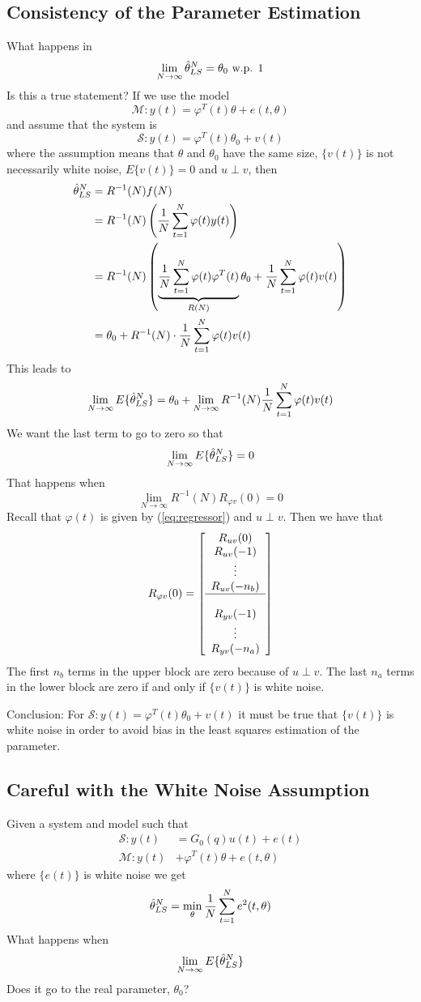 \subsection{Consistency of the Parameter Estimation}
What happens in
$$\lim_{N\to\infty} \hat{\theta}_{LS}^N  = \theta_0 \text{ w.p. } 1$$
Is this a true statement? If we use the model
$$\mathcal{M}: y(t) = \varphi^T(t)\theta + e(t,\theta)$$
and assume that the system is
$$\mathcal{S}: y(t) = \varphi^T(t)\theta_0 + v(t)$$
where the assumption means that $\theta$ and $\theta_0$ have the same size, $\{v(t)\}$ is not necessarily white noise, $E\{v(t)\} = 0$ and $u\perp v$, then
\begin{align}
\label{eq:thn}
\hat{\theta}_{LS}^N &= R^{-1}(N)f(N) \nonumber \\
&= R^{-1}(N)\left(\frac{1}{N}\sum_{t=1}^N\varphi(t)y(t)\right) \nonumber \\
&= R^{-1}(N)\left( \underbrace{\frac{1}{N}\sum_{t=1}^N\varphi(t)\varphi^T(t)}_{R(N)}\theta_0+\frac{1}{N}\sum_{t=1}^N\varphi(t)v(t)\right) \nonumber\\
&= \theta_0 + R^{-1}(N)\cdot \frac{1}{N}\sum_{t=1}^N\varphi(t)v(t)
\end{align}
This leads to
$$\lim_{N\to\infty} E\{\hat{\theta}_{LS}^N\} = \theta_0 + \lim_{N\to\infty}R^{-1}(N)\frac{1}{N}\sum_{t=1}^N\varphi(t)v(t)$$
We want the last term to go to zero so that
$$\lim_{N\to\infty} E\{\hat{\theta}_{LS}^N\} = 0$$
That happens when
$$\lim_{N\to\infty} R^{-1}(N)R_{\varphi v}(0) = 0$$
Recall that $\varphi(t)$ is given by (\ref{eq:regressor}) and $u\perp v$. Then we have that
$$R_{\varphi v}(0) = \left[\begin{array}{c} R_{uv}(0) \\ R_{uv}(-1) \\ \vdots \\ R_{uv}(-n_b) \\ \hline \\ R_{yv}(-1) \\ \vdots \\ R_{yv}(-n_a) \end{array}\right]$$
The first $n_b$ terms in the upper block are zero because of $u\perp v$. The last $n_a$ terms in the lower block are zero if and only if $\{v(t)\}$ is white noise.

Conclusion: For $\mathcal{S}: y(t) = \varphi^T(t)\theta_0 + v(t)$ it must be true that $\{v(t)\}$ is white noise in order to avoid bias in the least squares estimation of the parameter.

\subsection{Careful with the White Noise Assumption}
Given a system and model such that
\begin{align*}
\mathcal{S}: y(t) &= G_0(q)u(t) + e(t) \\
\mathcal{M}: y(t) &+ \varphi^T(t)\theta + e(t,\theta)
\end{align*}
where $\{e(t)\}$ is white noise we get
$$\hat{\theta}_{LS}^N = \min_\theta \frac{1}{N}\sum_{t=1}^N e^2(t,\theta)$$
What happens when
$$\lim_{N\to\infty} E\{\hat{\theta}_{LS}^N\}$$
Does it go to the real parameter, $\theta_0$?

